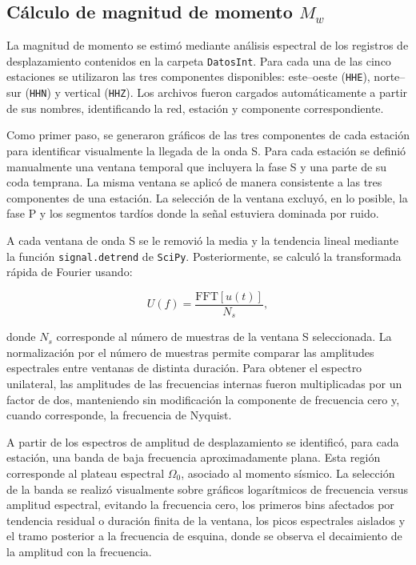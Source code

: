 \documentclass[a4paper,12pt]{article} %
\numberwithin{equation}{section} %
\numberwithin{figure}{section} %
\begin{document}
\subsection{Cálculo de magnitud de momento \(M_w\)}

La magnitud de momento se estimó mediante análisis espectral de los registros de desplazamiento contenidos en la carpeta \texttt{DatosInt}. Para cada una de las cinco estaciones se utilizaron las tres componentes disponibles: este--oeste (\texttt{HHE}), norte--sur (\texttt{HHN}) y vertical (\texttt{HHZ}). Los archivos fueron cargados automáticamente a partir de sus nombres, identificando la red, estación y componente correspondiente.

Como primer paso, se generaron gráficos de las tres componentes de cada estación para identificar visualmente la llegada de la onda S. Para cada estación se definió manualmente una ventana temporal que incluyera la fase S y una parte de su coda temprana. La misma ventana se aplicó de manera consistente a las tres componentes de una estación. La selección de la ventana excluyó, en lo posible, la fase P y los segmentos tardíos donde la señal estuviera dominada por ruido.

A cada ventana de onda S se le removió la media y la tendencia lineal mediante la función \texttt{signal.detrend} de \texttt{SciPy}. Posteriormente, se calculó la transformada rápida de Fourier usando:

\[
U(f) =
\frac{\mathrm{FFT}[u(t)]}{N_s},
\]

donde \(N_s\) corresponde al número de muestras de la ventana S seleccionada. La normalización por el número de muestras permite comparar las amplitudes espectrales entre ventanas de distinta duración. Para obtener el espectro unilateral, las amplitudes de las frecuencias internas fueron multiplicadas por un factor de dos, manteniendo sin modificación la componente de frecuencia cero y, cuando corresponde, la frecuencia de Nyquist.

A partir de los espectros de amplitud de desplazamiento se identificó, para cada estación, una banda de baja frecuencia aproximadamente plana. Esta región corresponde al plateau espectral \(\Omega_0\), asociado al momento sísmico. La selección de la banda se realizó visualmente sobre gráficos logarítmicos de frecuencia versus amplitud espectral, evitando la frecuencia cero, los primeros bins afectados por tendencia residual o duración finita de la ventana, los picos espectrales aislados y el tramo posterior a la frecuencia de esquina, donde se observa el decaimiento de la amplitud con la frecuencia.
\end{document}

